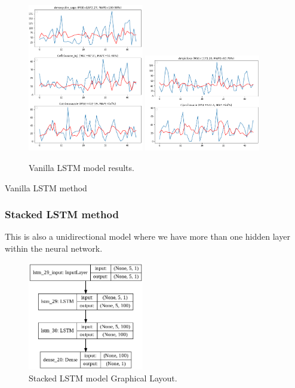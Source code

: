 \documentclass[12pt]{report}
\begin{document}
  \begin{figure}[H]%
  \begin {center}
  \includegraphics[width=0.45\textwidth]{images/vanilla1 (2).png}
  \includegraphics[width=0.45\textwidth]{images/vanilla1 (4).png}
  \caption{Vanilla LSTM model results.}
  \label{fig:ecg}
  \end {center}
  \end{figure}
  
  
  Vanilla LSTM method

  \subsubsection{Stacked LSTM method}

This is also a unidirectional model where we have more than one hidden layer within the neural network.
\begin{figure}[H]%
\begin {center}
\includegraphics[width=0.45\textwidth]{StackedLstm.png}
\caption{Stacked LSTM model Graphical Layout.}
\label{fig:ecg}
\end {center}
\end{figure}
\end{document}
